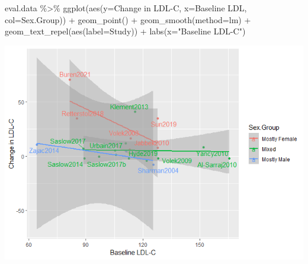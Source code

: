 \documentclass[
]{article}
\newenvironment{Shaded}{\begin{snugshade}}{\end{snugshade}}
\newcommand{\AttributeTok}[1]{\textcolor[rgb]{0.77,0.63,0.00}{#1}}
\newcommand{\FunctionTok}[1]{\textcolor[rgb]{0.00,0.00,0.00}{#1}}
\newcommand{\NormalTok}[1]{#1}
\newcommand{\OtherTok}[1]{\textcolor[rgb]{0.56,0.35,0.01}{#1}}
\newcommand{\SpecialCharTok}[1]{\textcolor[rgb]{0.00,0.00,0.00}{#1}}
\newcommand{\StringTok}[1]{\textcolor[rgb]{0.31,0.60,0.02}{#1}}
\begin{document}
\begin{Shaded}
\begin{Highlighting}[]
\NormalTok{eval.data }\SpecialCharTok{\%\textgreater{}\%}
  \FunctionTok{ggplot}\NormalTok{(}\FunctionTok{aes}\NormalTok{(}\AttributeTok{y=}\StringTok{\textasciigrave{}}\AttributeTok{Change in LDL{-}C}\StringTok{\textasciigrave{}}\NormalTok{,}
             \AttributeTok{x=}\StringTok{\textasciigrave{}}\AttributeTok{Baseline LDL}\StringTok{\textasciigrave{}}\NormalTok{,}
             \AttributeTok{col=}\StringTok{\textasciigrave{}}\AttributeTok{Sex.Group}\StringTok{\textasciigrave{}}\NormalTok{)) }\SpecialCharTok{+}
  \FunctionTok{geom\_point}\NormalTok{() }\SpecialCharTok{+}
  \FunctionTok{geom\_smooth}\NormalTok{(}\AttributeTok{method=}\StringTok{\textquotesingle{}lm\textquotesingle{}}\NormalTok{) }\SpecialCharTok{+}
  \FunctionTok{geom\_text\_repel}\NormalTok{(}\FunctionTok{aes}\NormalTok{(}\AttributeTok{label=}\NormalTok{Study)) }\SpecialCharTok{+}
  \FunctionTok{labs}\NormalTok{(}\AttributeTok{x=}\StringTok{"Baseline LDL{-}C"}\NormalTok{)}
\end{Highlighting}
\end{Shaded}

\includegraphics{figures/ldl-change-vs-baseline-3.png}

\begin{Shaded}
\end{Shaded}
\end{document}
